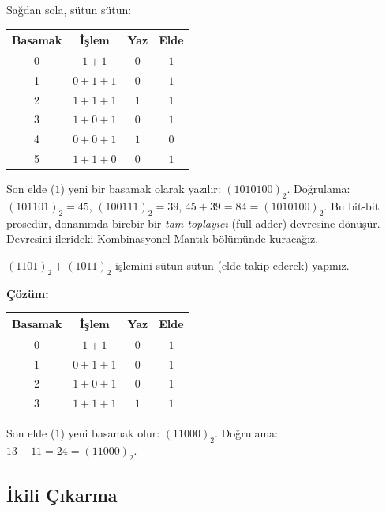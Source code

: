 \begin{ornek}[$(101101)_2+(100111)_2$]
Sağdan sola, sütun sütun:
\begin{center}
\begin{tabular}{cccc}
\toprule
Basamak & İşlem & Yaz & Elde \\
\midrule
0 & $1+1$ & $0$ & $1$ \\
1 & $0+1+1$ & $0$ & $1$ \\
2 & $1+1+1$ & $1$ & $1$ \\
3 & $1+0+1$ & $0$ & $1$ \\
4 & $0+0+1$ & $1$ & $0$ \\
5 & $1+1+0$ & $0$ & $1$ \\
\bottomrule
\end{tabular}
\end{center}
Son elde ($1$) yeni bir basamak olarak yazılır: $(1010100)_2$. Doğrulama:
$(101101)_2=45$, $(100111)_2=39$, $45+39=84=(1010100)_2$. \checkmark Bu bit-bit prosedür,
donanımda birebir bir \emph{tam toplayıcı} (full adder) devresine dönüşür. Devresini
ilerideki Kombinasyonel Mantık bölümünde kuracağız.
\end{ornek}

\begin{alistirma}[\kolay]
$(1101)_2+(1011)_2$ işlemini sütun sütun (elde takip ederek) yapınız.
\end{alistirma}

\noindent\textbf{Çözüm:}
\begin{center}
\begin{tabular}{cccc}
\toprule
Basamak & İşlem & Yaz & Elde \\
\midrule
0 & $1+1$ & $0$ & $1$ \\
1 & $0+1+1$ & $0$ & $1$ \\
2 & $1+0+1$ & $0$ & $1$ \\
3 & $1+1+1$ & $1$ & $1$ \\
\bottomrule
\end{tabular}
\end{center}
Son elde ($1$) yeni basamak olur: $(11000)_2$. Doğrulama: $13+11=24=(11000)_2$. \checkmark

\subsection{İkili Çıkarma}
\label{sec:ikili-cikarma}

